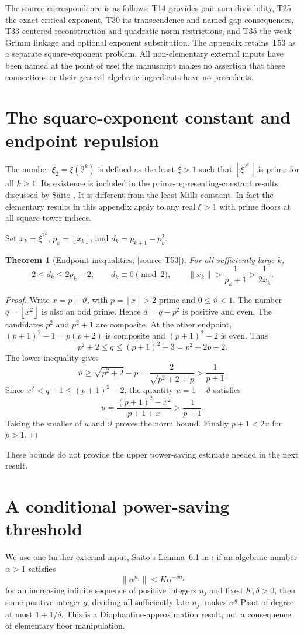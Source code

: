 \documentclass[11pt,a4paper]{article}
\newtheorem{theorem}{Theorem}[section]
\theoremstyle{definition}\newtheorem{definition}[theorem]{Definition}
\theoremstyle{remark}\newtheorem{remark}[theorem]{Remark}
\newcommand{\floor}[1]{\left\lfloor #1\right\rfloor}\newcommand{\ceil}[1]{\left\lceil #1\right\rceil}
\newcommand{\sourceT}[1]{\textup{[source T#1]}}
\begin{document}
The source correspondence is as follows: T14 provides pair-sum divisibility, T25 the exact critical exponent, T30 its transcendence and named gap consequences, T33 centered reconstruction and quadratic-norm restrictions, and T35 the weak Grimm linkage and optional exponent substitution. The appendix retains T53 as a separate square-exponent problem. All non-elementary external inputs have been named at the point of use; the manuscript makes no assertion that these connections or their general algebraic ingredients have no precedents.

\appendix
\section{The square-exponent constant and endpoint repulsion}
The number $\xi_2=\xi(2^k)$ is defined as the least $\xi>1$ such that $\floor{\xi^{2^k}}$ is prime for all $k\ge1$. Its existence is included in the prime-representing-constant results discussed by Saito \cite{saito-irrational,saito-variants}. It is different from the least Mills constant. In fact the elementary results in this appendix apply to any real $\xi>1$ with prime floors at all square-tower indices.

Set $x_k=\xi^{2^k}$, $p_k=\floor{x_k}$, and $d_k=p_{k+1}-p_k^2$.
\begin{theorem}[Endpoint inequalities; \sourceT{53}]\label{thm:endpoint}
For all sufficiently large $k$,
\[
 2\le d_k\le2p_k-2,\qquad d_k\equiv0\pmod2,
 \qquad \|x_k\|>\frac1{p_k+1}>\frac1{2x_k}.
\]
\end{theorem}
\begin{proof}
Write $x=p+\vartheta$, with $p=\floor x>2$ prime and $0\le\vartheta<1$. The number $q=\floor{x^2}$ is also an odd prime. Hence $d=q-p^2$ is positive and even. The candidates $p^2$ and $p^2+1$ are composite. At the other endpoint, $(p+1)^2-1=p(p+2)$ is composite and $(p+1)^2-2$ is even. Thus
\[
 p^2+2\le q\le(p+1)^2-3=p^2+2p-2.
\]
The lower inequality gives
\[
 \vartheta\ge\sqrt{p^2+2}-p
 =\frac2{\sqrt{p^2+2}+p}>\frac1{p+1}.
\]
Since $x^2<q+1\le(p+1)^2-2$, the quantity $u=1-\vartheta$ satisfies
\[
 u=\frac{(p+1)^2-x^2}{p+1+x}>\frac1{p+1}.
\]
Taking the smaller of $u$ and $\vartheta$ proves the norm bound. Finally $p+1<2x$ for $p>1$.
\end{proof}
These bounds do not provide the upper power-saving estimate needed in the next result.

\section{A conditional power-saving threshold}
We use one further external input, Saito's Lemma~6.1 in \cite{saito-variants}: if an algebraic number $\alpha>1$ satisfies
\[
 \|\alpha^{n_j}\|\le K\alpha^{-\delta n_j}
\]
for an increasing infinite sequence of positive integers $n_j$ and fixed $K,\delta>0$, then some positive integer $g$, dividing all sufficiently late $n_j$, makes $\alpha^g$ Pisot of degree at most $1+1/\delta$. This is a Diophantine-approximation result, not a consequence of elementary floor manipulation.
\end{document}
